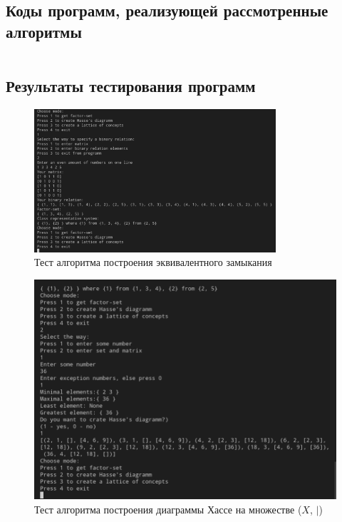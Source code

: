 \documentclass[bachelor, och, labwork]{shiza}
\begin{document}
    \subsection{Коды программ, реализующей рассмотренные алгоритмы}


        \inputminted[fontsize=\small]{Python}{code/aua-lab2.py}








    \subsection{Результаты тестирования программ}
    
        \begin{figure}[H]
            \centering
            \includegraphics[width=0.8\textwidth]{photo/1.png}
            \caption{Тест алгоритма построения эквивалентного замыкания}
        \end{figure}

        \begin{figure}[H]
            \centering
            \includegraphics[width=1\textwidth]{photo/2.png}
            \caption{Тест алгоритма построения диаграммы Хассе на множестве ($X$, $|$)}
        \end{figure}
\end{document}
